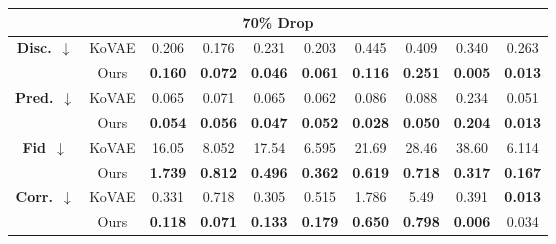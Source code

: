 \documentclass{article}
\theoremstyle{plain}
\theoremstyle{definition}
\theoremstyle{remark}
\begin{document}
{\begin{table*}[!t]
{\begin{tabular}{cc|cccccccc}
    \multicolumn{10}{c}{\textbf{70\% Drop}} \\
    \midrule
    \multirow{2}{*}{\textbf{Disc.}~$\downarrow$}
      & KoVAE 
          & 0.206 
          & 0.176 
          & 0.231 
          & 0.203 
          & 0.445 
          & 0.409 
          & 0.340 
          & 0.263 \\
      & Ours  
          & \cellcolor{blue!10}\textbf{0.160}
          & \cellcolor{blue!10}\textbf{0.072}
          & \cellcolor{blue!10}\textbf{0.046}
          & \cellcolor{blue!10}\textbf{0.061}
          & \cellcolor{blue!10}\textbf{0.116}
          & \cellcolor{blue!10}\textbf{0.251}
          & \cellcolor{blue!10}\textbf{0.005}
          & \cellcolor{blue!10}\textbf{0.013} \\
    \midrule
    \multirow{2}{*}{\textbf{Pred.}~$\downarrow$}
      & KoVAE 
          & 0.065 
          & 0.071 
          & 0.065 
          & 0.062 
          & 0.086 
          & 0.088 
          & 0.234 
          & 0.051 \\
      & Ours  
          & \cellcolor{blue!10}\textbf{0.054}
          & \cellcolor{blue!10}\textbf{0.056}
          & \cellcolor{blue!10}\textbf{0.047}
          & \cellcolor{blue!10}\textbf{0.052}
          & \cellcolor{blue!10}\textbf{0.028}
          & \cellcolor{blue!10}\textbf{0.050}
          & \cellcolor{blue!10}\textbf{0.204}
          & \cellcolor{blue!10}\textbf{0.013} \\
    \midrule
    \multirow{2}{*}{\textbf{Fid}~$\downarrow$}
      & KoVAE 
          & 16.05 
          & 8.052 
          & 17.54 
          & 6.595 
          & 21.69 
          & 28.46 
          & 38.60 
          & 6.114 \\
      & Ours  
          & \cellcolor{blue!10}\textbf{1.739}
          & \cellcolor{blue!10}\textbf{0.812}
          & \cellcolor{blue!10}\textbf{0.496}
          & \cellcolor{blue!10}\textbf{0.362}
          & \cellcolor{blue!10}\textbf{0.619}
          & \cellcolor{blue!10}\textbf{0.718}
          & \cellcolor{blue!10}\textbf{0.317}
          & \cellcolor{blue!10}\textbf{0.167} \\
    \midrule
    \multirow{2}{*}{\textbf{Corr.}~$\downarrow$}
      & KoVAE 
          & 0.331 
          & 0.718 
          & 0.305 
          & 0.515 
          & 1.786 
          & 5.49  
          & 0.391 
          & \cellcolor{blue!10}\textbf{0.013} \\   %
      & Ours  
          & \cellcolor{blue!10}\textbf{0.118}
          & \cellcolor{blue!10}\textbf{0.071}
          & \cellcolor{blue!10}\textbf{0.133}
          & \cellcolor{blue!10}\textbf{0.179}
          & \cellcolor{blue!10}\textbf{0.650}
          & \cellcolor{blue!10}\textbf{0.798}
          & \cellcolor{blue!10}\textbf{0.006}
          & 0.034 \\  %
    \bottomrule
\end{tabular}
}
\end{table*}

}
\end{document}
